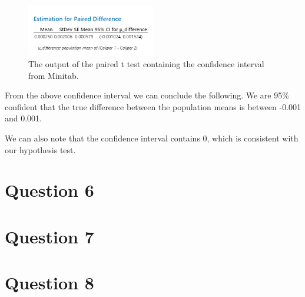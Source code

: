 \documentclass{article}
\begin{document}
\begin{figure}[h]
  \centering
  \includegraphics[width=0.5\textwidth]{./images/5_a.png}
  \caption{The output of the paired t test containing the confidence interval from Minitab.}
  \label{fig:5_a}
\end{figure}
From the above confidence interval we can conclude the following.
We are 95\% confident that the true difference between the population means is between -0.001 and 0.001.

We can also note that the confidence interval contains 0, which is consistent with our hypothesis test.

\section*{Question 6}

\section*{Question 7}

\section*{Question 8}
\end{document}
